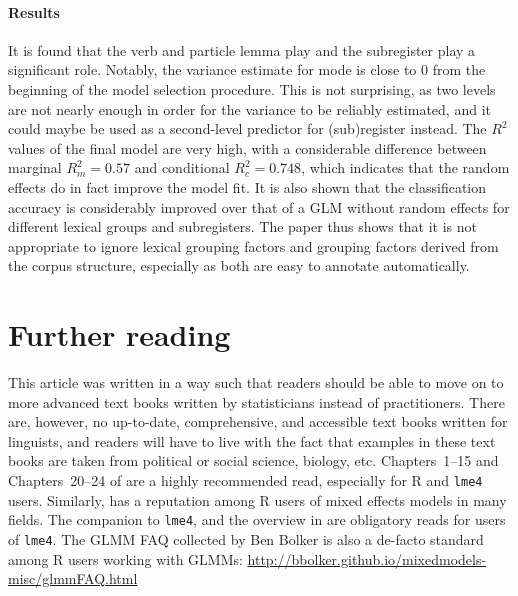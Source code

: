\documentclass[a4paper,12pt]{article}
\begin{document}
\begin{mdframed}
  \paragraph{Results}

  It is found that the verb and particle lemma play and the subregister play a significant role.
  Notably, the variance estimate for mode is close to $0$ from the beginning of the model selection procedure.
  This is not surprising, as two levels are not nearly enough in order for the variance to be reliably estimated, and it could maybe be used as a second-level predictor for (sub)register instead.
  The $R^2$ values of the final model are very high, with a considerable difference between marginal $R^2_m=0.57$ and conditional $R^2_c=0.748$, which indicates that the random effects do in fact improve the model fit.
  It is also shown that the classification accuracy is considerably improved over that of a GLM without random effects for different lexical groups and subregisters.
  The paper thus shows that it is not appropriate to ignore lexical grouping factors and grouping factors derived from the corpus structure, especially as both are easy to annotate automatically.

\end{mdframed}

\section{Further reading}
\label{sec:furtherreading}

This article was written in a way such that readers should be able to move on to more advanced text books written by statisticians instead of practitioners.
There are, however, no up-to-date, comprehensive, and accessible text books written for linguists, and readers will have to live with the fact that examples in these text books are taken from political or social science, biology, etc. 
Chapters~1--15 and Chapters~20--24 of \citet{GelmanHill2006} are a highly recommended read, especially for R and \texttt{lme4} users.
Similarly, \citet{ZuurEa2009} has a reputation among R users of mixed effects models in many fields.
The companion to \texttt{lme4}, \citet{Bates2010} and the overview in \citet{BatesEa2015} are obligatory reads for users of \texttt{lme4}.
The GLMM FAQ collected by Ben Bolker is also a de-facto standard among R users working with GLMMs: \url{http://bbolker.github.io/mixedmodels-misc/glmmFAQ.html}

\printbibliography
\end{document}
